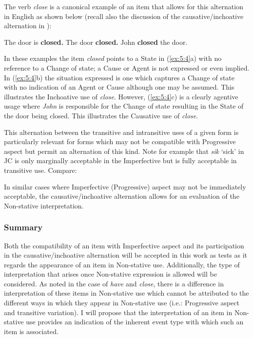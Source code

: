 The verb \textit{close} is a canonical example of an item that allows for this alternation in English as shown below (recall also the discussion of the causative\slash inchoative alternation in ):

\ea\label{ex:5:4}
 \citep[53]{Pustejovsky1991}
\ea The door is \textbf{closed.}
\ex The door \textbf{closed.}
\ex John \textbf{closed} the door.
\z
\z

In these examples the item \textit{closed} points to a State in (\ref{ex:5:4}a) with no reference to a Change of state; a Cause or Agent is not expressed or even implied. In (\ref{ex:5:4}b) the situation expressed is one which captures a Change of state with no indication of an Agent or Cause although one may be assumed. This illustrates the Inchoative use of \textit{close}. However, (\ref{ex:5:4}c) is a clearly agentive usage where \textit{John} is responsible for the Change of state resulting in the State of the door being closed. This illustrates the Causative use of \textit{close}. 

This alternation between the transitive and intransitive uses of a given form is particularly relevant for forms which may not be compatible with Progressive aspect but permit an alternation of this kind. Note for example that \textit{sik} `sick' in JC is only marginally acceptable in the Imperfective but is fully acceptable in transitive use. Compare:

\ea%
\label{ex:5:5}
 
\z
\z

In similar cases where Imperfective (Progressive) aspect may not be immediately acceptable, the causative\slash inchoative alternation allows for an evaluation of the Non-stative interpretation. 

\subsubsection{Summary}\label{sec:5.1.1.1}

Both the compatibility of an item with Imperfective aspect and its participation in the causative\slash inchoative alternation will be accepted in this work as tests as it regards the appearance of an item in Non-stative use. Additionally, the type of interpretation that arises once Non-stative expression is allowed will be considered. As noted in the case of \textit{have} and \textit{close}, there is a difference in interpretation of these items in Non-stative use which cannot be attributed to the different ways in which they appear in Non-stative use (i.e.: Progressive aspect and transitive variation). I will propose that the interpretation of an item in Non-stative use provides an indication of the inherent event type with which such an item is associated. 

